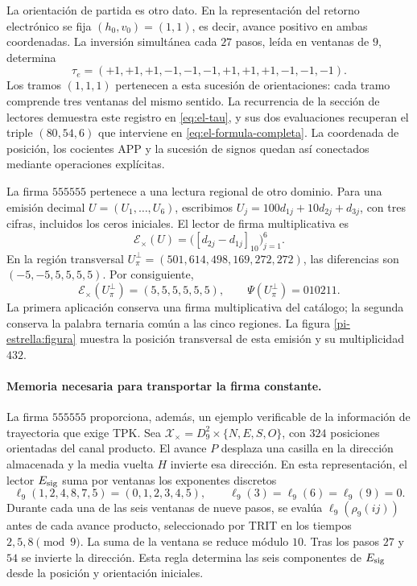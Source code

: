 La orientación de partida es otro dato. En la representación del
retorno electrónico se fija \((h_0,v_0)=(1,1)\), es decir, avance
positivo en ambas coordenadas. La inversión simultánea cada \(27\)
pasos, leída en ventanas de \(9\), determina
\[
 \tau_e=(+1,+1,+1,-1,-1,-1,+1,+1,+1,-1,-1,-1).
\]
Los tramos \((1,1,1)\) pertenecen a esta sucesión de orientaciones:
cada tramo comprende tres ventanas del mismo sentido. La recurrencia
de la sección de lectores demuestra este registro en
\eqref{eq:el-tau}, y sus dos evaluaciones recuperan el triple
\((80,54,6)\) que interviene en
\eqref{eq:el-formula-completa}. La coordenada de posición, los
cocientes APP y la sucesión de signos quedan así conectados mediante
operaciones explícitas.

La firma \(555555\) pertenece a una lectura regional de otro
dominio. Para una emisión decimal \(U=(U_1,\ldots,U_6)\), escribimos
\(U_j=100d_{1j}+10d_{2j}+d_{3j}\), con tres cifras, incluidos los
ceros iniciales. El lector de firma multiplicativa es
\[
 \mathcal E_\times(U)
   =\bigl([d_{2j}-d_{1j}]_{10}\bigr)_{j=1}^{6}.
\]
En la región transversal
\(U_\pi^\perp=(501,614,498,169,272,272)\), las diferencias son
\((-5,-5,5,5,5,5)\). Por consiguiente,
\begin{equation}
 \mathcal E_\times(U_\pi^\perp)=(5,5,5,5,5,5),\qquad
 \Psi(U_\pi^\perp)=010211.
 \label{el-centro:firma-transversal}
\end{equation}
La primera aplicación conserva una firma multiplicativa del catálogo;
la segunda conserva la palabra ternaria común a las cinco regiones.
La figura \ref{pi-estrella:figura} muestra la posición transversal de
esta emisión y su multiplicidad \(432\).

\paragraph{Memoria necesaria para transportar la firma constante.}
La firma \(555555\) proporciona, además, un ejemplo verificable de
la información de trayectoria que exige TPK. Sea
\(\mathcal X_\times=D_9^2\times\{N,E,S,O\}\), con \(324\)
posiciones orientadas del canal producto. El avance \(P\) desplaza
una casilla en la dirección almacenada y la media vuelta \(H\)
invierte esa dirección. En esta representación, el lector
\(E_{\rm sig}\) suma por ventanas los exponentes discretos
\[
 \ell_9(1,2,4,8,7,5)=(0,1,2,3,4,5),\qquad
 \ell_9(3)=\ell_9(6)=\ell_9(9)=0.
\]
Durante cada una de las seis ventanas de nueve pasos, se evalúa
\(\ell_9(\rho_9(ij))\) antes de cada avance producto, seleccionado
por TRIT en los tiempos \(2,5,8\pmod9\). La suma de la ventana se
reduce módulo \(10\). Tras los pasos \(27\) y \(54\) se invierte
la dirección. Esta regla determina las seis componentes de
\(E_{\rm sig}\) desde la posición y orientación iniciales.

